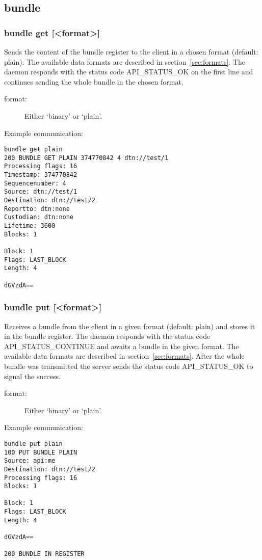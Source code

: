 \documentclass[12pt, a4paper]{scrartcl}
\begin{document}
\subsection{bundle}
\subsubsection*{bundle get [<format>]}
Sends the content of the bundle register to the client in a chosen format (default: plain).
The available data formats are described in section~\ref{sec:formats}.
The daemon responds with the status code API\_STATUS\_OK on the first line and continues sending the whole bundle in the chosen format.
\begin{description}
\item[format:] Either `binary' or `plain'.
\end{description}
Example communication:\\
\makebox[\textwidth]{\hrulefill}
\begin{verbatim}
bundle get plain
200 BUNDLE GET PLAIN 374770842 4 dtn://test/1
Processing flags: 16
Timestamp: 374770842
Sequencenumber: 4
Source: dtn://test/1
Destination: dtn://test/2
Reportto: dtn:none
Custodian: dtn:none
Lifetime: 3600
Blocks: 1

Block: 1
Flags: LAST_BLOCK
Length: 4

dGVzdA==

\end{verbatim}
\makebox[\textwidth]{\hrulefill}
\subsubsection*{bundle put [<format>]}
Receives a bundle from the client in a given format (default: plain) and stores it in the bundle register.
The daemon responds with the status code API\_STATUS\_CONTINUE and awaits a bundle in the given format.
The available data formats are described in section~\ref{sec:formats}.
After the whole bundle was transmitted the server sends the status code API\_STATUS\_OK to signal the success.
\begin{description}
\item[format:] Either `binary' or `plain'.
\end{description}
Example communication:\\
\makebox[\textwidth]{\hrulefill}
\begin{verbatim}
bundle put plain
100 PUT BUNDLE PLAIN
Source: api:me
Destination: dtn://test/2
Processing flags: 16
Blocks: 1

Block: 1
Flags: LAST_BLOCK
Length: 4

dGVzdA==

200 BUNDLE IN REGISTER
\end{verbatim}
\makebox[\textwidth]{\hrulefill}
\end{document}
